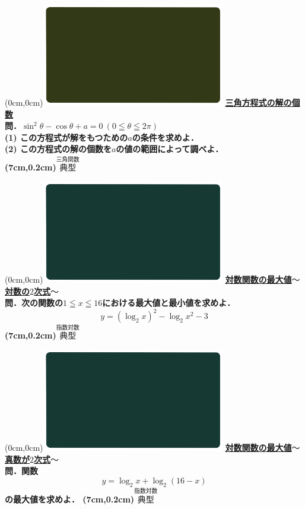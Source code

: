 \documentclass[10pt,
fleqn,
dvipdfmx,
uplatex
]{jsarticle}
\begin{document}
\at(0cm,0cm){\includegraphics[width=8cm,bb=0 0 1920 1080]{./youtube/thumbnails/templates/smart_background/三角関数.jpeg}}
{\color{orange}\bf\boldmath\LARGE\underline{三角方程式の解の個数}}\vspace{0.3zw}\\
\large 
\bf\boldmath 問．$\sin ^2\theta -\cos \theta +a=0\ \left(0\leqq \theta \leqq 2\pi \right)$\\
(1)  この方程式が解をもつための$a$の条件を求めよ．\\
(2)  この方程式の解の個数を$a$の値の範囲によって調べよ．\\

\at(7cm,0.2cm){\small\color{bradorange}$\overset{\text{三角関数}}{\text{典型}}$}

\newpage

\at(0cm,0cm){\includegraphics[width=8cm,bb=0 0 1920 1080]{./youtube/thumbnails/templates/smart_background/指数対数.jpeg}}
{\color{orange}\bf\boldmath\large\underline{対数関数の最大値$〜$対数の$2$次式$〜$}}\vspace{0.3zw}\\
\Large 
\bf\boldmath 問．次の関数の$1\leqq x\leqq {16}$における最大値と最小値を求めよ．
\[y=\left(\log _2x\right)^2-\log _2x^2-3\]
\at(7cm,0.2cm){\small\color{bradorange}$\overset{\text{指数対数}}{\text{典型}}$}

\newpage

\at(0cm,0cm){\includegraphics[width=8cm,bb=0 0 1920 1080]{./youtube/thumbnails/templates/smart_background/指数対数.jpeg}}
{\color{orange}\bf\boldmath\large\underline{対数関数の最大値$〜$真数が$2$次式$〜$}}\vspace{0.3zw}\\
\LARGE  
\bf\boldmath 問．関数
\Large
\[y=\log _2x+\log _2\left({16}-x\right)\]
\LARGE  
の最大値を求めよ．
\at(7cm,0.2cm){\small\color{bradorange}$\overset{\text{指数対数}}{\text{典型}}$}
\end{document}
